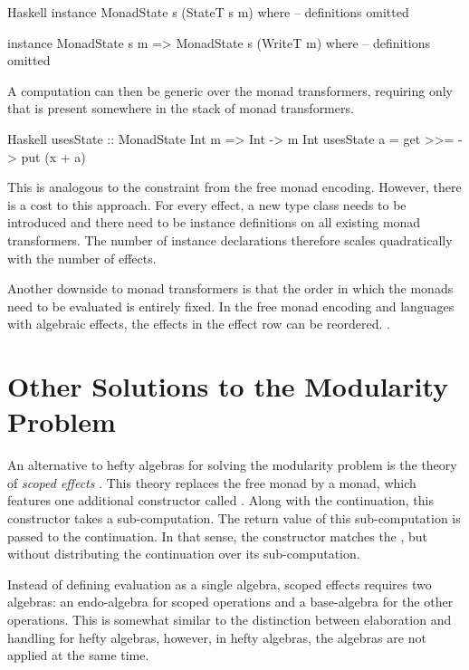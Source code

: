 \begin{lst}{Haskell}
instance MonadState s (StateT s m) where
  -- definitions omitted

instance MonadState s m => MonadState s (WriteT m) where
  -- definitions omitted
\end{lst}

\noindent A computation can then be generic over the monad transformers, requiring only that  is present somewhere in the stack of monad transformers.

\begin{lst}{Haskell}
usesState :: MonadState Int m => Int -> m Int
usesState a = get >>= \x -> put (x + a)
\end{lst}

\noindent This is analogous to the  constraint from the free monad encoding. However, there is a cost to this approach. For every effect, a new type class needs to be introduced and there need to be instance definitions on all existing monad transformers. The number of instance declarations therefore scales quadratically with the number of effects.

Another downside to monad transformers is that the order in which the monads need to be evaluated is entirely fixed. In the free monad encoding and languages with algebraic effects, the effects in the effect row can be reordered. .

\section{Other Solutions to the Modularity Problem}

An alternative to hefty algebras for solving the modularity problem is the theory of \emph{scoped effects} \autocite{wu_effect_2014,pirog_syntax_2018,yang_structured_2022}. This theory replaces the free monad by a  monad, which features one additional constructor called . Along with the continuation, this constructor takes a sub-computation. The return value of this sub-computation is passed to the continuation. In that sense, the  constructor matches the \hs{>>=}, but without distributing the continuation over its sub-computation.

Instead of defining evaluation as a single algebra, scoped effects requires two algebras: an endo-algebra for scoped operations and a base-algebra for the other operations. This is somewhat similar to the distinction between elaboration and handling for hefty algebras, however, in hefty algebras, the algebras are not applied at the same time.

